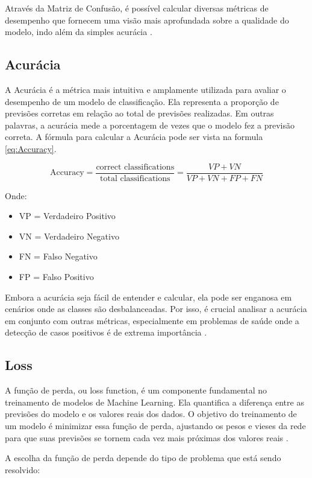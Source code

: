Através da Matriz de Confusão, é possível calcular diversas métricas de desempenho que fornecem uma visão mais aprofundada sobre a qualidade do modelo, indo além da simples acurácia \cite{Pighini2025}.

\subsection{Acurácia}
A Acurácia é a métrica mais intuitiva e amplamente utilizada para avaliar o desempenho de um modelo de classificação. Ela representa a proporção de previsões corretas em relação ao total de previsões realizadas. Em outras palavras, a acurácia mede a porcentagem de vezes que o modelo fez a previsão correta.
A fórmula para calcular a Acurácia pode ser vista na formula \ref{eq:Accuracy}.

\begin{equation}
	\text{Accuracy} = \frac{\text{correct classifications}}{\text{total classifications}} = \frac{VP + VN}{VP+VN+FP+FN} 
	 \label{eq:Accuracy}
\end{equation}

Onde:
\begin{itemize}
    \item VP = Verdadeiro Positivo
    \item VN = Verdadeiro Negativo
    \item FN = Falso Negativo
    \item FP = Falso Positivo
\end{itemize}
Embora a acurácia seja fácil de entender e calcular, ela pode ser enganosa em cenários onde as classes são desbalanceadas. Por isso, é crucial analisar a acurácia em conjunto com outras métricas, especialmente em problemas de saúde onde a detecção de casos positivos é de extrema importância \cite{Hastie2009}.

\subsection{Loss}
A função de perda, ou loss function, é um componente fundamental no treinamento de modelos de Machine Learning. Ela quantifica a diferença entre as previsões do modelo e os valores reais dos dados. O objetivo do treinamento de um modelo é minimizar essa função de perda, ajustando os pesos e vieses da rede para que suas previsões se tornem cada vez mais próximas dos valores reais \cite{Goodfellow2016}.

A escolha da função de perda depende do tipo de problema que está sendo resolvido:

